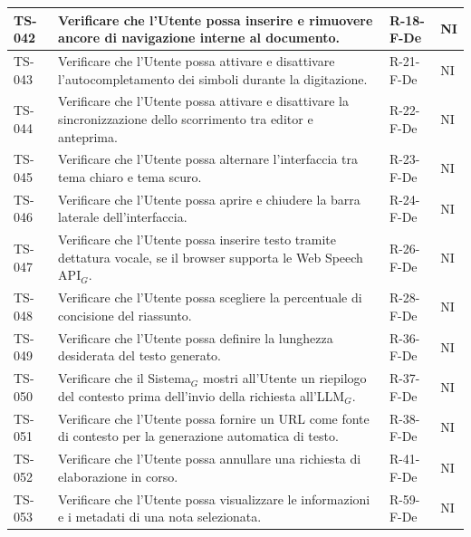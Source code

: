 \documentclass[a4paper, 10pt, colorlinks=true, linkcolor=black, urlcolor=blue, citecolor=blue, hidelinks]{article}
\begin{document}
\begin{longtable}{|p{1.4cm}|p{7.8cm}|p{2.3cm}|p{1.2cm}|}
    TS-042 & Verificare che l'Utente possa inserire e rimuovere ancore di navigazione interne al documento. & R-18-F-De & NI \\
    \hline
    TS-043 & Verificare che l'Utente possa attivare e disattivare l'autocompletamento dei simboli durante la digitazione. & R-21-F-De & NI \\
    \hline
    TS-044 & Verificare che l'Utente possa attivare e disattivare la sincronizzazione dello scorrimento tra editor e anteprima. & R-22-F-De & NI \\
    \hline
    TS-045 & Verificare che l'Utente possa alternare l'interfaccia tra tema chiaro e tema scuro. & R-23-F-De & NI \\
    \hline
    TS-046 & Verificare che l'Utente possa aprire e chiudere la barra laterale dell'interfaccia. & R-24-F-De & NI \\
    \hline
    TS-047 & Verificare che l'Utente possa inserire testo tramite dettatura vocale, se il browser supporta le Web Speech API$_G$. & R-26-F-De & NI \\
    \hline
    TS-048 & Verificare che l'Utente possa scegliere la percentuale di concisione del riassunto. & R-28-F-De & NI \\
    \hline
    TS-049 & Verificare che l'Utente possa definire la lunghezza desiderata del testo generato. & R-36-F-De & NI \\
    \hline
    TS-050 & Verificare che il Sistema$_G$ mostri all'Utente un riepilogo del contesto prima dell'invio della richiesta all'LLM$_G$. & R-37-F-De & NI \\
    \hline
    TS-051 & Verificare che l'Utente possa fornire un URL come fonte di contesto per la generazione automatica di testo. & R-38-F-De & NI \\
    \hline
    TS-052 & Verificare che l'Utente possa annullare una richiesta di elaborazione in corso. & R-41-F-De & NI \\
    \hline
    TS-053 & Verificare che l'Utente possa visualizzare le informazioni e i metadati di una nota selezionata. & R-59-F-De & NI \\
    \hline


\end{longtable}
\end{document}
